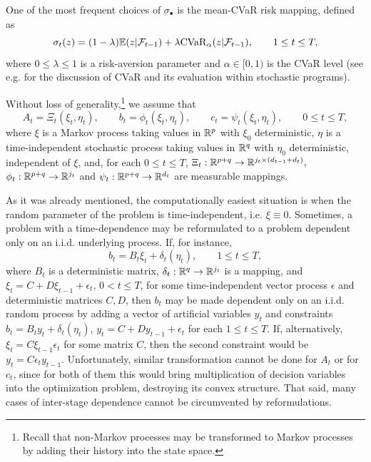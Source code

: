 \documentclass{article}              %
\begin{document}
One of the most frequent choices of $\sigma_{\bullet}$ is the
mean-CVaR risk mapping, defined as 
\[
\sigma_{t}(z)=(1-\lambda)\mathbb{E}(z|\mathcal{F}_{t-1})+\lambda \mathrm{CVaR}_{\alpha}(z|\mathcal{F}_{t-1}),\qquad1\leq t\leq T,
\]
where $0\leq\lambda\leq1$ is a risk-aversion parameter and $\alpha \in [0,1)$
is the CVaR level (see e.g. \cite{rockafellar2002conditional} for
the discussion of CVaR and its evaluation within stochastic programs).

Without loss of generality,\footnote{Recall that non-Markov processes may be transformed to Markov processes by adding their history into the state space.} we assume that
\begin{equation}
A_{t}=\Xi_{t}(\xi_{t},\eta_{t}),\qquad b_{t}=\phi_{t}(\xi_{t},\eta_{t}),\qquad c_{t}=\psi_{t}(\xi_{t},\eta_{t}),\qquad0\leq t\leq T,\label{eq:exi}
\end{equation}
where $\xi$ is a Markov process taking values in $\mathbb{R}^{p}$ with
$\xi_{0}$ deterministic, $\eta$ is a time-independent stochastic
process taking values in $\mathbb{R}^{q}$ with $\eta_{0}$ deterministic,
independent of $\xi$, and, for each $0\leq t\leq T$, $\Xi_{t}:\mathbb{R}^{p+q}\rightarrow\mathbb{R}^{j_{t}\times (d_{t-1}+d_{t}) },$
 $\phi_{t}:\mathbb{R}^{p+q}\rightarrow\mathbb{R}^{j_{t}}$ and $\psi_{t}:\mathbb{R}^{p+q}\rightarrow\mathbb{R}^{d_{t}}$
are measurable mappings.

As it was already mentioned, the computationally easiest situation is when the random parameter
of the problem is time-independent, i.e. $\xi\equiv0$. Sometimes, a problem with a time-dependence may be reformulated to a problem dependent
only on an i.i.d. underlying process. If, for instance, 
\begin{equation}
b_{t}=B_{t}\xi_{t}+\delta_{t}(\eta_{t}),\qquad1\leq t\leq T,\label{eq:bbd}
\end{equation}
where $B_{t}$ is a deterministic matrix, $\delta_{t}:\mathbb{R}^q \rightarrow \mathbb{R}^{j_t}$ is a mapping,
and $\xi_{t}=C+D\xi_{t-1}+\epsilon_{t}$, $0<t\leq T$, for some time-independent
vector process $\epsilon$ and deterministic matrices $C,D$, then
$b_{t}$ may be made dependent only on an i.i.d. random process by
adding a vector of artificial variables $y_{t}$ and constraints
$b_{t}=B_{t}y_{t}+\delta_{t}(\eta_{t})$, $y_{t}=C+Dy_{t-1}+\epsilon_{t}$
for each $1\leq t\leq T$. If, alternatively, $\xi_{t}=C\xi_{t-1}\epsilon_{t}$
for some matrix $C$, then the second constraint would be $y_{t}=C\epsilon_{t}y_{t-1}$.
Unfortunately, similar transformation cannot be done for $A_{t}$ or
for $c_{t}$, since for both of them this would bring multiplication
of decision variables into the optimization problem, destroying its convex structure. That said, many cases of inter-stage dependence cannot be circumvented by reformulations.
\end{document}
